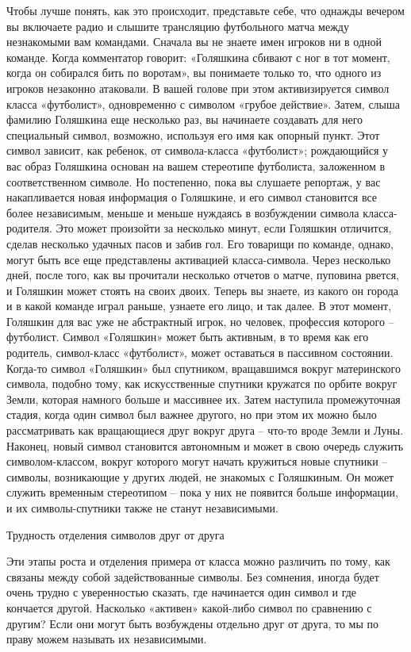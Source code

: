 \documentclass[../main.tex]{subfiles}
\begin{document}
Чтобы лучше понять, как это происходит, представьте себе, что однажды вечером вы включаете радио и слышите трансляцию футбольного матча между незнакомыми вам командами. Сначала вы не знаете имен игроков ни в одной команде. Когда комментатор говорит: «Голяшкина сбивают с ног в тот момент, когда он собирался бить по воротам», вы понимаете только то, что одного из игроков незаконно атаковали. В вашей голове при этом активизируется символ класса «футболист», одновременно с символом «грубое действие». Затем, слыша фамилию Голяшкина еще несколько раз, вы начинаете создавать для него специальный символ, возможно, используя его имя как опорный пункт. Этот символ зависит, как ребенок, от символа-класса «футболист»; рождающийся у вас образ Голяшкина основан на вашем стереотипе футболиста, заложенном в соответственном символе. Но постепенно, пока вы слушаете репортаж, у вас накапливается новая информация о Голяшкине, и его символ становится все более независимым, меньше и меньше нуждаясь в возбуждении символа класса-родителя. Это может произойти за несколько минут, если Голяшкин отличится, сделав несколько удачных пасов и забив гол. Его товарищи по команде, однако, могут быть все еще представлены активацией класса-символа. Через несколько дней, после того, как вы прочитали несколько отчетов о матче, пуповина рвется, и Голяшкин может стоять на своих двоих. Теперь вы знаете, из какого он города и в какой команде играл раньше, узнаете его лицо, и так далее. В этот момент, Голяшкин для вас уже не абстрактный игрок, но человек, профессия которого \--- футболист. Символ «Голяшкин» может быть активным, в то время как его родитель, символ-класс «футболист», может оставаться в пассивном состоянии. Когда-то символ «Голяшкин» был спутником, вращавшимся вокруг материнского символа, подобно тому, как искусственные спутники кружатся по орбите вокруг Земли, которая намного больше и массивнее их. Затем наступила промежуточная стадия, когда один символ был важнее другого, но при этом их можно было рассматривать как вращающиеся друг вокруг друга \--- что-то вроде Земли и Луны. Наконец, новый символ становится автономным и может в свою очередь служить символом-классом, вокруг которого могут начать кружиться новые спутники \--- символы, возникающие у других людей, не знакомых с Голяшкиным. Он может служить временным стереотипом \--- пока у них не появится больше информации, и их символы-спутники также не станут независимыми.

Трудность отделения символов друг от друга

Эти этапы роста и отделения примера от класса можно различить по тому, как связаны между собой задействованные символы. Без сомнения, иногда будет очень трудно с уверенностью сказать, где начинается один символ и где кончается другой. Насколько «активен» какой-либо символ по сравнению с другим? Если они могут быть возбуждены отдельно друг от друга, то мы по праву можем называть их независимыми.
\end{document}
